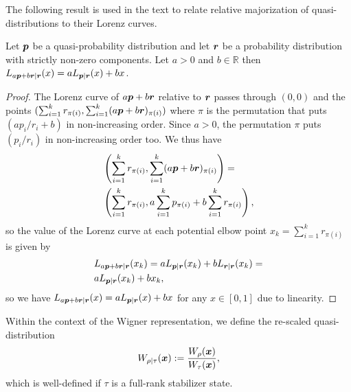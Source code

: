 \documentclass[pra,
aps,
twocolumn,
superscriptaddress,
groupedaddress,
nofootinbib,
reprint
]{revtex4-1}
\begin{document}
The following result is used in the text to relate relative majorization of quasi-distributions to their Lorenz curves.
\begin{proposition}\label{lemma:Lorenz_linearity}
	Let $\boldsymbol{p}$ be a quasi-probability distribution and let $\boldsymbol{r}$ be a probability distribution with strictly non-zero components. Let $a > 0$ and $b \in \mathbb{R}$ then $L_{a\boldsymbol{p} + b \boldsymbol{r} | \boldsymbol{r}} (x) = a L_{\boldsymbol{p} |\boldsymbol{r}}(x) + b x$.
\end{proposition}
\begin{proof} 
	The Lorenz curve of $a\boldsymbol{p} + b \boldsymbol{r}$ relative to $\boldsymbol{r}$ passes through $(0,0)$ and the points $(\sum_{i=1}^k{r_{\pi(i)}}, \sum_{i=1}^k(a \boldsymbol{p} + b \boldsymbol{r})_{\pi(i)})$ where $\pi$ is the permutation that puts $(a p_i/r_i + b)$ in non-increasing order. Since $a > 0$, the permutation $\pi$ puts  $(p_i/r_i)$ in non-increasing order too. We thus have
\begin{align*}
&\left( \sum_{i=1}^kr_{\pi(i)}, \sum_{i=1}^k(a \boldsymbol{p} + b \boldsymbol{r})_{\pi(i)} \right) = \\ 
&\left( \sum_{i=1}^k r_{\pi(i)},a \sum_{i=1}^k  p_{\pi(i)} + b\sum_{i=1}^k r_{\pi(i)} \right) \nonumber,
\end{align*}
so the value of the Lorenz curve at each potential elbow point $x_k = \sum_{i=1} ^kr_{\pi(i)}$ is given by
\begin{align}
&L_{a \boldsymbol{p} +b \boldsymbol{r}|\boldsymbol{r}} (x_k) = a L_{\boldsymbol{p}|\boldsymbol{r}} (x_k) + b L_{\boldsymbol{r}|\boldsymbol{r}}(x_k) = \nonumber\\
&a L_{\boldsymbol{p}|\boldsymbol{r}} (x_k) + b x_k,
\end{align}
so we have $L_{a\boldsymbol{p}  + b\boldsymbol{r}|\boldsymbol{r}} (x) = a L_{\boldsymbol{p} |\boldsymbol{r}}(x) + b x$ for any $x \in [0,1]$ due to linearity.
\end{proof}

Within the context of the Wigner representation, we define the re-scaled quasi-distribution
\begin{equation}
	W_{\rho|\tau}(\boldsymbol{x}) := \frac{W_\rho (\boldsymbol{x}) }{ W_\tau(\boldsymbol{x})},
\end{equation}
which is well-defined if $\tau$ is a full-rank stabilizer state.
\end{document}
